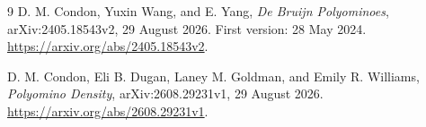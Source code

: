 \documentclass[11pt]{article}
\begin{document}
\begin{thebibliography}{9}
D. M. Condon, Yuxin Wang, and E. Yang,
\emph{De Bruijn Polyominoes}, arXiv:2405.18543v2,
29 August 2026. First version: 28 May 2024.
\url{https://arxiv.org/abs/2405.18543v2}.

D. M. Condon, Eli B. Dugan, Laney M. Goldman, and Emily R. Williams,
\emph{Polyomino Density}, arXiv:2608.29231v1,
29 August 2026.
\url{https://arxiv.org/abs/2608.29231v1}.
\end{thebibliography}
\end{document}

